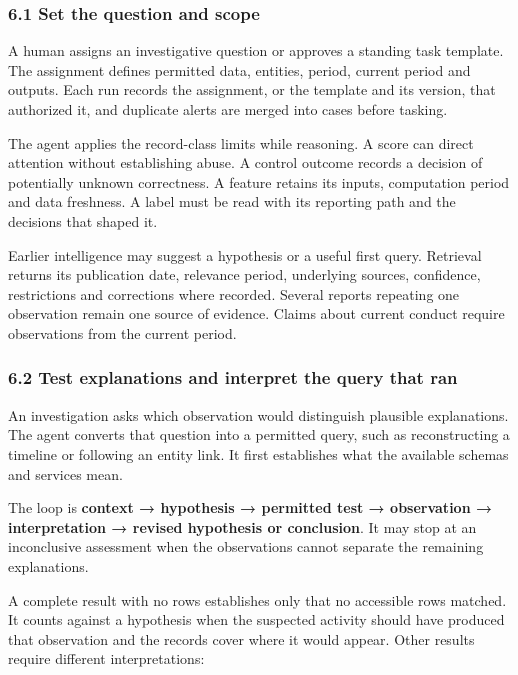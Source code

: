 \documentclass[
  11pt,
]{article}
\begin{document}
\hypertarget{set-the-question-and-scope}{%
\subsubsection{6.1 Set the question and
scope}\label{set-the-question-and-scope}}

A human assigns an investigative question or approves a standing task
template. The assignment defines permitted data, entities, period,
current period and outputs. Each run records the assignment, or the
template and its version, that authorized it, and duplicate alerts are
merged into cases before tasking.

The agent applies the record-class limits while reasoning. A score can
direct attention without establishing abuse. A control outcome records a
decision of potentially unknown correctness. A feature retains its
inputs, computation period and data freshness. A label must be read with
its reporting path and the decisions that shaped it.

Earlier intelligence may suggest a hypothesis or a useful first query.
Retrieval returns its publication date, relevance period, underlying
sources, confidence, restrictions and corrections where recorded.
Several reports repeating one observation remain one source of evidence.
Claims about current conduct require observations from the current
period.

\hypertarget{test-explanations-and-interpret-the-query-that-ran}{%
\subsubsection{6.2 Test explanations and interpret the query that
ran}\label{test-explanations-and-interpret-the-query-that-ran}}

An investigation asks which observation would distinguish plausible
explanations. The agent converts that question into a permitted query,
such as reconstructing a timeline or following an entity link. It first
establishes what the available schemas and services mean.

The loop is \textbf{context → hypothesis → permitted test → observation
→ interpretation → revised hypothesis or conclusion}. It may stop at an
inconclusive assessment when the observations cannot separate the
remaining explanations.

A complete result with no rows establishes only that no accessible rows
matched. It counts against a hypothesis when the suspected activity
should have produced that observation and the records cover where it
would appear. Other results require different interpretations:
\end{document}
